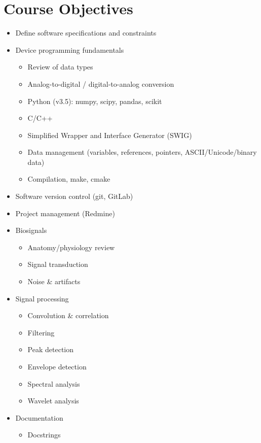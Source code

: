 \section*{Course Objectives}
\begin{multicols}{2}
\begin{itemize}
    \item Define software specifications and constraints
    \item Device programming fundamentals
    \begin{itemize}
        \item Review of data types
        \item Analog-to-digital / digital-to-analog conversion
        \item Python (v3.5): numpy, scipy, pandas, scikit
        \item C/C++
        \item Simplified Wrapper and Interface Generator (SWIG)
        \item Data management (variables, references, pointers, ASCII/Unicode/binary data)
        \item Compilation, make, cmake
    \end{itemize}
    \item Software version control (git, GitLab)
    \item Project management (Redmine)
    \item Biosignals
    \begin{itemize}
        \item Anatomy/physiology review
        \item Signal transduction
        \item Noise \& artifacts
    \end{itemize}
    \item Signal processing
    \begin{itemize}
        \item Convolution \& correlation
        \item Filtering
        \item Peak detection
        \item Envelope detection
        \item Spectral analysis
        \item Wavelet analysis
    \end{itemize}
    \item Documentation
    \begin{itemize}
        \item Docstrings

\end{itemize}
\end{itemize}
\end{multicols}
